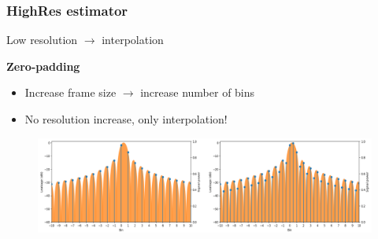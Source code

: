 \documentclass[table]{beamer}
\begin{document}
\logo{}
\begin{frame}
\frametitle{HighRes estimator}
    \vfill
    Low resolution $\rightarrow$ interpolation
    \bigskip

    {\large \textbf{Zero-padding}}
    \begin{itemize}
        \item Increase frame size $\rightarrow$ increase number of bins
        \item No resolution increase, only interpolation!
    \end{itemize}
    \vfill

    \begin{figure}[H]
        \includegraphics[width=\linewidth]{figures/zeropad.png}
    \end{figure}
\end{frame}
\end{document}
